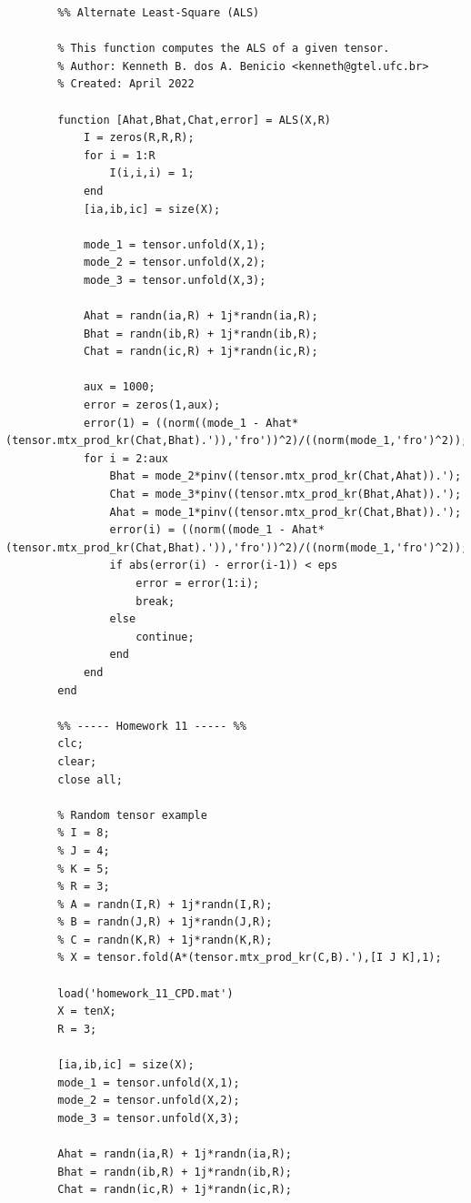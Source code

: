 \documentclass[a4paper,10pt]{article}
\begin{document}
    \begin{verbatim}
        %% Alternate Least-Square (ALS)

        % This function computes the ALS of a given tensor.   
        % Author: Kenneth B. dos A. Benicio <kenneth@gtel.ufc.br>
        % Created: April 2022

        function [Ahat,Bhat,Chat,error] = ALS(X,R)
            I = zeros(R,R,R); 
            for i = 1:R
                I(i,i,i) = 1; 
            end
            [ia,ib,ic] = size(X);

            mode_1 = tensor.unfold(X,1);
            mode_2 = tensor.unfold(X,2);
            mode_3 = tensor.unfold(X,3);

            Ahat = randn(ia,R) + 1j*randn(ia,R);
            Bhat = randn(ib,R) + 1j*randn(ib,R);
            Chat = randn(ic,R) + 1j*randn(ic,R);

            aux = 1000;
            error = zeros(1,aux);
            error(1) = ((norm((mode_1 - Ahat*(tensor.mtx_prod_kr(Chat,Bhat).')),'fro'))^2)/((norm(mode_1,'fro')^2));
            for i = 2:aux
                Bhat = mode_2*pinv((tensor.mtx_prod_kr(Chat,Ahat)).');
                Chat = mode_3*pinv((tensor.mtx_prod_kr(Bhat,Ahat)).');
                Ahat = mode_1*pinv((tensor.mtx_prod_kr(Chat,Bhat)).');
                error(i) = ((norm((mode_1 - Ahat*(tensor.mtx_prod_kr(Chat,Bhat).')),'fro'))^2)/((norm(mode_1,'fro')^2));
                if abs(error(i) - error(i-1)) < eps
                    error = error(1:i);
                    break;
                else
                    continue;
                end
            end
        end

        %% ----- Homework 11 ----- %%
        clc;
        clear;
        close all;

        % Random tensor example
        % I = 8;
        % J = 4;
        % K = 5;
        % R = 3;
        % A = randn(I,R) + 1j*randn(I,R);
        % B = randn(J,R) + 1j*randn(J,R);
        % C = randn(K,R) + 1j*randn(K,R);
        % X = tensor.fold(A*(tensor.mtx_prod_kr(C,B).'),[I J K],1);

        load('homework_11_CPD.mat')
        X = tenX;
        R = 3;

        [ia,ib,ic] = size(X);
        mode_1 = tensor.unfold(X,1);
        mode_2 = tensor.unfold(X,2);
        mode_3 = tensor.unfold(X,3);

        Ahat = randn(ia,R) + 1j*randn(ia,R);
        Bhat = randn(ib,R) + 1j*randn(ib,R);
        Chat = randn(ic,R) + 1j*randn(ic,R);


\end{verbatim}
\end{document}
